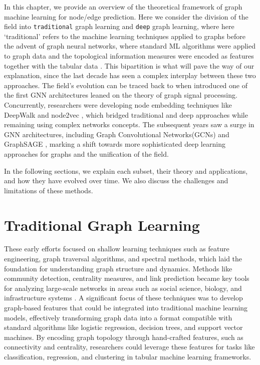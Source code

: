 In this chapter, we provide an overview of the theoretical framework
of graph machine learning for node/edge prediction. Here we consider
the division of the field into \texttt{traditional} graph learning and
\texttt{deep} graph learning, where here `traditional' refers to the
machine learning techniques applied to graphs before the advent of
graph neural networks, where standard ML algorithms were applied to
graph data and the topological information measures were encoded as
features together with the tabular data
\cite{costa2007characterization, silva2016machine}. This bipartition
is what will pave the way of our explanation, since the last decade
has seen a complex interplay between these two approaches. The field's
evolution can be traced back to when 
introduced one of the first GNN architectures leaned on the theory of
graph signal processing. Concurrently, researchers were developing
node embedding techniques like DeepWalk \cite{perozzi2014deepwalk} and
node2vec \cite{grover2016node2vec}, which bridged traditional and deep
approaches while remaining using complex networks concepts. The
subsequent years saw a surge in GNN architectures, including Graph
Convolutional Networks(GCNs) \cite{kipf2016semi} and GraphSAGE
\cite{hamilton2017inductive}, marking a shift towards more
sophisticated deep learning approaches for graphs and the unification
of the field.

In the following sections, we explain each subset, their theory and
applications, and how they have evolved over time. We also discuss the
challenges and limitations of these methods.

\section{Traditional Graph Learning}

\label{classical_learning}

These early efforts focused on shallow learning techniques such as
feature engineering, graph traversal algorithms, and spectral methods,
which laid the foundation for understanding graph structure and
dynamics. Methods like community detection, centrality measures, and
link prediction \cite{silva2016machine} became key tools for analyzing
large-scale networks in areas such as social science, biology, and
infrastructure systems
\cite{newman2018networks,boccaletti2006complex}. A significant focus
of these techniques was to develop graph-based features that could be
integrated into traditional machine learning models, effectively
transforming graph data into a format compatible with standard
algorithms like logistic regression, decision trees, and support
vector machines. By encoding graph topology through hand-crafted
features, such as connectivity and centrality, researchers could
leverage these features for tasks like classification, regression, and
clustering in tabular machine learning frameworks.


